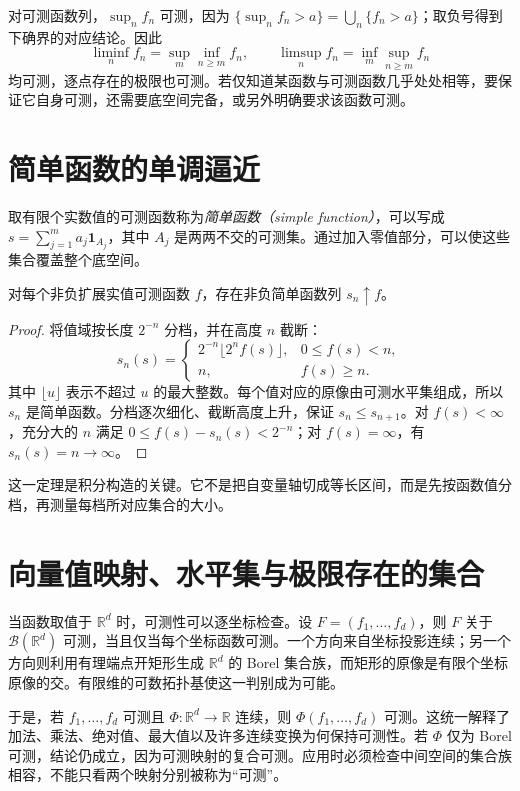 对可测函数列，$\sup_nf_n$ 可测，因为 $\{\sup_nf_n>a\}=\bigcup_n\{f_n>a\}$；取负号得到下确界的对应结论。因此
\[
 \liminf_nf_n=\sup_m\inf_{n\geq m}f_n,\qquad
 \limsup_nf_n=\inf_m\sup_{n\geq m}f_n
\]
均可测，逐点存在的极限也可测。若仅知道某函数与可测函数几乎处处相等，要保证它自身可测，还需要底空间完备，或另外明确要求该函数可测。

\section{简单函数的单调逼近}
\begin{definition}
取有限个实数值的可测函数称为\emph{简单函数（simple function）}，可以写成 $s=\sum_{j=1}^{m}a_j\mathbf1_{A_j}$，其中 $A_j$ 是两两不交的可测集。通过加入零值部分，可以使这些集合覆盖整个底空间。
\end{definition}

\begin{theorem}
对每个非负扩展实值可测函数 $f$，存在非负简单函数列 $s_n\uparrow f$。
\label{thm:mt-simple-approximation}
\end{theorem}
\begin{proof}
将值域按长度 $2^{-n}$ 分档，并在高度 $n$ 截断：
\[
 s_n(s)=
 \begin{cases}
  2^{-n}\lfloor 2^nf(s)\rfloor,&0\leq f(s)<n,\\
  n,&f(s)\geq n.
 \end{cases}
\]
其中 $\lfloor u\rfloor$ 表示不超过 $u$ 的最大整数。每个值对应的原像由可测水平集组成，所以 $s_n$ 是简单函数。分档逐次细化、截断高度上升，保证 $s_n\leq s_{n+1}$。对 $f(s)<\infty$，充分大的 $n$ 满足 $0\leq f(s)-s_n(s)<2^{-n}$；对 $f(s)=\infty$，有 $s_n(s)=n\to\infty$。
\end{proof}
这一定理是积分构造的关键。它不是把自变量轴切成等长区间，而是先按函数值分档，再测量每档所对应集合的大小。

\section{向量值映射、水平集与极限存在的集合}
当函数取值于 $\mathbb R^d$ 时，可测性可以逐坐标检查。设 $F=(f_1,\ldots,f_d)$，则 $F$ 关于 $\mathcal B(\mathbb R^d)$ 可测，当且仅当每个坐标函数可测。一个方向来自坐标投影连续；另一个方向则利用有理端点开矩形生成 $\mathbb R^d$ 的 Borel 集合族，而矩形的原像是有限个坐标原像的交。有限维的可数拓扑基使这一判别成为可能。

于是，若 $f_1,\ldots,f_d$ 可测且 $\Phi:\mathbb R^d\to\mathbb R$ 连续，则 $\Phi(f_1,\ldots,f_d)$ 可测。这统一解释了加法、乘法、绝对值、最大值以及许多连续变换为何保持可测性。若 $\Phi$ 仅为 Borel 可测，结论仍成立，因为可测映射的复合可测。应用时必须检查中间空间的集合族相容，不能只看两个映射分别被称为“可测”。

